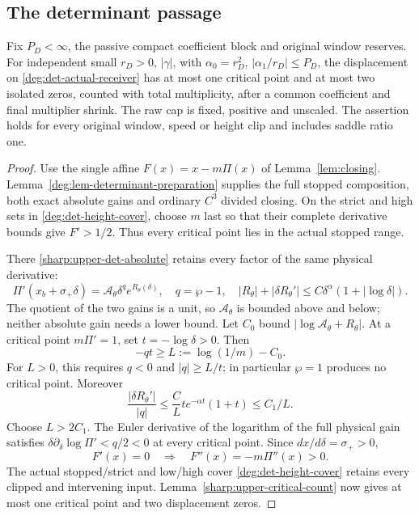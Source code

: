 \subsection{The determinant passage}

\begin{proposition}\label{sharp:upper-determinant}
Fix \(P_D<\infty\), the passive compact coefficient block and original
window reserves. For independent small \(r_D>0\), \(|\gamma|\), with
\(\alpha_0=r_D^2\), \(|\alpha_1/r_D|\le P_D\), the displacement on
\eqref{deg:det-actual-receiver} has at most one critical point and at most
two isolated zeros, counted with total multiplicity, after a common
coefficient and final multiplier shrink. The raw cap is fixed, positive
and unscaled. The assertion holds for every original window, speed or
height clip and includes saddle ratio one.
\end{proposition}

\begin{proof}
Use the single affine \(F(x)=x-m\Pi(x)\) of Lemma~\ref{lem:closing}.
Lemma~\ref{deg:lem-determinant-preparation} supplies the full stopped
composition, both exact absolute gains and ordinary \(C^3\) divided
closing. On the strict and high sets in \eqref{deg:det-height-cover},
choose \(m\) last so that their complete derivative bounds give
\(F'>1/2\). Thus every critical point lies in the actual stopped range.

There \eqref{sharp:upper-det-absolute} retains every factor of the same
physical derivative:
\[
 \Pi'(x_b+\sigma_+\delta)=\mathcal A_\theta\delta^q e^{R_\theta(\delta)},
 \quad q=\wp-1,\quad
 |R_\theta|+|\delta R_\theta'|\le C\delta^\alpha(1+|\log\delta|).
\]
The quotient of the two gains is a unit, so \(\mathcal A_\theta\)
is bounded above and below; neither absolute gain needs a lower bound.
Let \(C_0\) bound \(|\log\mathcal A_\theta+R_\theta|\).
At a critical point \(m\Pi'=1\), set \(t=-\log\delta>0\). Then
\[
 -qt\ge L:=\log(1/m)-C_0.
\]
For \(L>0\), this requires \(q<0\) and \(|q|\ge L/t\);
in particular \(\wp=1\) produces no critical point. Moreover
\[
 \frac{|\delta R_\theta'|}{|q|}
 \le\frac C L t e^{-\alpha t}(1+t)\le C_1/L.
\]
Choose \(L>2C_1\). The Euler derivative of the logarithm of the full
physical gain satisfies
\(\delta\partial_\delta\log\Pi'<q/2<0\) at every critical point.
Since \(dx/d\delta=\sigma_+>0\),
\begin{equation}\label{sharp:upper-det-critical}
 F'(x)=0\quad\Longrightarrow\quad F''(x)=-m\Pi''(x)>0.
\end{equation}
The actual stopped/strict and low/high cover
\eqref{deg:det-height-cover} retains every clipped and intervening
input. Lemma~\ref{sharp:upper-critical-count} now gives at most
one critical point and two displacement zeros.
\end{proof}

